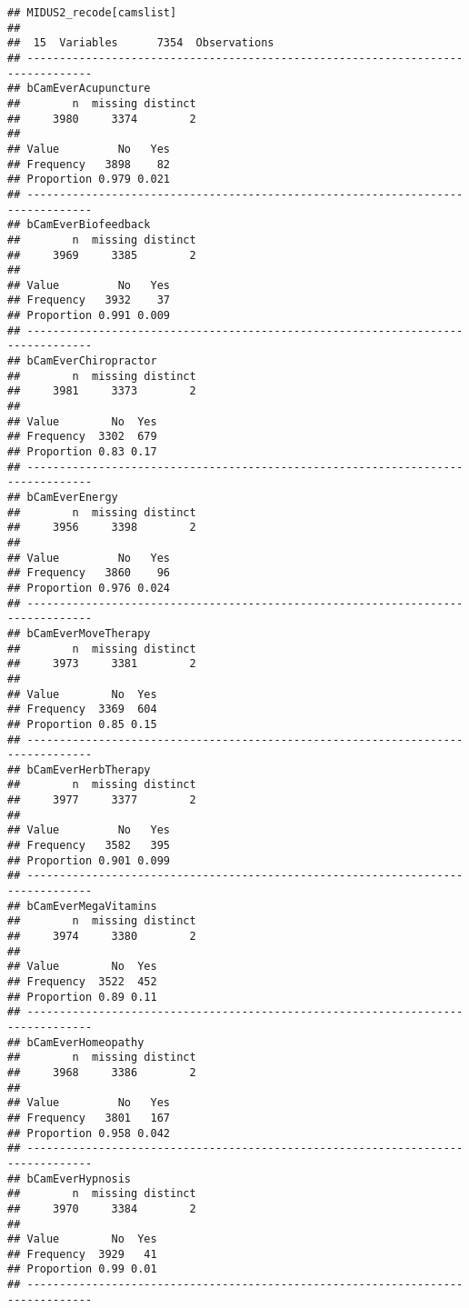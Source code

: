 \documentclass[
]{article}
\begin{document}
\begin{verbatim}
## MIDUS2_recode[camslist] 
## 
##  15  Variables      7354  Observations
## --------------------------------------------------------------------------------
## bCamEverAcupuncture 
##        n  missing distinct 
##     3980     3374        2 
##                       
## Value         No   Yes
## Frequency   3898    82
## Proportion 0.979 0.021
## --------------------------------------------------------------------------------
## bCamEverBiofeedback 
##        n  missing distinct 
##     3969     3385        2 
##                       
## Value         No   Yes
## Frequency   3932    37
## Proportion 0.991 0.009
## --------------------------------------------------------------------------------
## bCamEverChiropractor 
##        n  missing distinct 
##     3981     3373        2 
##                     
## Value        No  Yes
## Frequency  3302  679
## Proportion 0.83 0.17
## --------------------------------------------------------------------------------
## bCamEverEnergy 
##        n  missing distinct 
##     3956     3398        2 
##                       
## Value         No   Yes
## Frequency   3860    96
## Proportion 0.976 0.024
## --------------------------------------------------------------------------------
## bCamEverMoveTherapy 
##        n  missing distinct 
##     3973     3381        2 
##                     
## Value        No  Yes
## Frequency  3369  604
## Proportion 0.85 0.15
## --------------------------------------------------------------------------------
## bCamEverHerbTherapy 
##        n  missing distinct 
##     3977     3377        2 
##                       
## Value         No   Yes
## Frequency   3582   395
## Proportion 0.901 0.099
## --------------------------------------------------------------------------------
## bCamEverMegaVitamins 
##        n  missing distinct 
##     3974     3380        2 
##                     
## Value        No  Yes
## Frequency  3522  452
## Proportion 0.89 0.11
## --------------------------------------------------------------------------------
## bCamEverHomeopathy 
##        n  missing distinct 
##     3968     3386        2 
##                       
## Value         No   Yes
## Frequency   3801   167
## Proportion 0.958 0.042
## --------------------------------------------------------------------------------
## bCamEverHypnosis 
##        n  missing distinct 
##     3970     3384        2 
##                     
## Value        No  Yes
## Frequency  3929   41
## Proportion 0.99 0.01
## --------------------------------------------------------------------------------

\end{verbatim}
\end{document}
